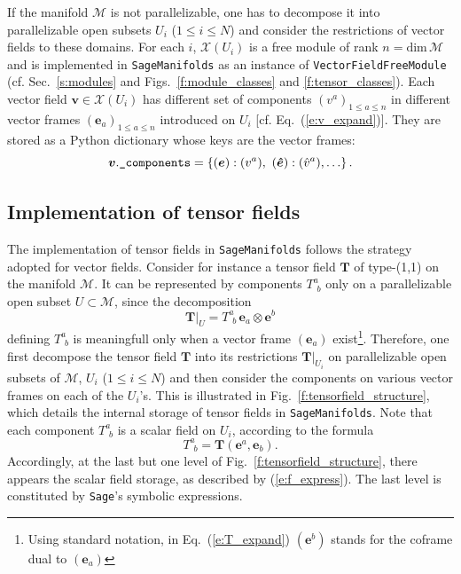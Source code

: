 \documentclass[a4paper]{jpconf}
\newcommand{\soft}[1]{\texttt{#1}}
\newcommand{\code}[1]{\texttt{#1}}
\newcommand{\Sage}{\soft{Sage}}
\newcommand{\SM}{\soft{SageManifolds}}
\newcommand{\be}{\begin{equation}}
\newcommand{\ee}{\end{equation}}
\newcommand{\w}[1]{\bm{#1}}
\begin{document}
If the manifold $\mathcal{M}$ is not parallelizable, one has to decompose it 
into parallelizable
open subsets $U_i$ ($1\leq i \leq N$) 
and consider the restrictions of vector fields to these domains.
For each $i$, $\mathcal{X}(U_i)$ is a free module of rank $n=\mathrm{dim}\, \mathcal{M}$ and is implemented in \SM{} as an instance of 
\code{VectorFieldFreeModule} (cf. Sec.~\ref{s:modules} and Figs.~\ref{f:module_classes}
and \ref{f:tensor_classes}). 
Each vector field $\w{v}\in  \mathcal{X}(U_i)$ has different set
of components $(v^a)_{1\leq a\leq n}$ in different vector frames 
$(\w{e}_a)_{1\leq a \leq n}$ introduced on $U_i$ [cf. Eq.~(\ref{e:v_expand})]. They are stored
as a Python dictionary whose keys are the vector frames:
\be
\w{v}.\mbox{\texttt{\_components}} = \left\{ (\w{e}): (v^a),
\ (\w{\hat e}): ({\hat v}^a), \ldots \right\}. 
\ee


\subsection{Implementation of tensor fields}

The implementation of tensor fields in \SM{} follows the strategy 
adopted for vector fields. Consider for instance a tensor field $\w{T}$ 
of type-(1,1) on the manifold $\mathcal{M}$. 
It can be represented by 
components $T^a_{\ \, b}$ only on a parallelizable open subset $U\subset
\mathcal{M}$, since the decomposition 
\be \label{e:T_expand}
    \left. \w{T} \right| _{U} = T^a_{\ \, b} \, \w{e}_a \otimes \w{e}^b
\ee
defining $T^a_{\ \, b}$ is meaningfull only when a vector frame 
$(\w{e}_a)$ exist\footnote{Using standard notation, in Eq.~(\ref{e:T_expand})
$(\w{e}^b)$ stands for the coframe dual to $(\w{e}_a)$}.
Therefore, one first decompose the tensor field $\w{T}$  into 
its restrictions $\left. \w{T} \right| _{U_i}$ on parallelizable open subsets
of $\mathcal{M}$, $U_i$ ($1\leq i\leq N$) and then consider 
the components on various vector frames on each of the $U_i$'s. 
This is illustrated in Fig.~\ref{f:tensorfield_structure}, which details the
internal storage of tensor fields in \SM{}. Note that each component
$T^a_{\ \, b}$ is a scalar field on $U_i$, according to the formula
\be
    T^a_{\ \, b} = \w{T}(\w{e}^a, \w{e}_b) . 
\ee
Accordingly, at the last but one level of Fig.~\ref{f:tensorfield_structure}, 
there appears the scalar field storage, as described by (\ref{e:f_express}).
The last level is constituted by \Sage{}'s symbolic expressions. 
\end{document}

